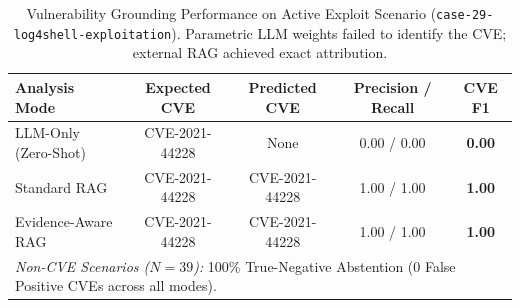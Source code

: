 \begin{table}[t]
\centering
\small
\caption{Vulnerability Grounding Performance on Active Exploit Scenario (\texttt{case-29-log4shell-exploitation}). Parametric LLM weights failed to identify the CVE; external RAG achieved exact attribution.}
\label{tab:cve_case_study}
\begin{tabular}{lcccc}
\toprule
\textbf{Analysis Mode} & \textbf{Expected CVE} & \textbf{Predicted CVE} & \textbf{Precision / Recall} & \textbf{CVE F1} \\
\midrule
LLM-Only (Zero-Shot) & CVE-2021-44228 & None & 0.00 / 0.00 & \textbf{0.00} \\
Standard RAG & CVE-2021-44228 & CVE-2021-44228 & 1.00 / 1.00 & \textbf{1.00} \\
Evidence-Aware RAG & CVE-2021-44228 & CVE-2021-44228 & 1.00 / 1.00 & \textbf{1.00} \\
\midrule
\multicolumn{5}{l}{\textit{Non-CVE Scenarios ($N = 39$):} 100\% True-Negative Abstention (0 False Positive CVEs across all modes).} \\
\bottomrule
\end{tabular}
\end{table}
